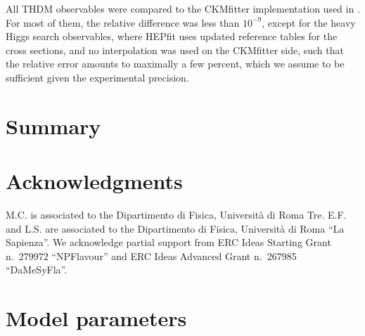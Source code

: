 \documentclass[preprint,3p,12pt]{elsarticle}
\begin{document}
All THDM observables were compared to the CKMfitter implementation used in \cite{Eberhardt:2013uba,Eberhardt:2013wia,Baglio:2014nea,Chowdhury:2015yja}. For most of them, the relative difference was less than $10^{-9}$, except for the heavy Higgs search observables, where HEPfit uses updated reference tables for the cross sections, and no interpolation was used on the CKMfitter side, such that the relative error amounts to maximally a few percent, which we assume to be sufficient given the experimental precision.


\section{Summary}



\section*{Acknowledgments}
M.C. is associated to the Dipartimento di Fisica, Universit\`a di Roma
Tre. E.F. and L.S. are associated to the Dipartimento di Fisica,
Universit\`a di Roma ``La Sapienza''. We acknowledge partial support
from ERC Ideas Starting Grant n.~279972 ``NPFlavour'' and ERC Ideas
Advanced Grant n.~267985 ``DaMeSyFla''.




\appendix

\section{Model parameters}
\label{sec:appModelParameters}
\end{document}
